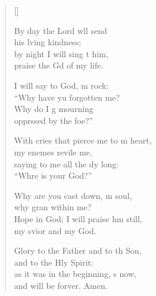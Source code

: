 \begin{verse}[\versewidth]
\begin{patverse}
By day the Lord w\pointup{\i}ll send\Med\\
his lving kindness;\\
by night I will sing t him,\Med\\
praise the Gd of my life.

I will say to God, m rock:\Med\\
“Why have yu forgotten me?\\
Why do I g mourning\Med\\
opprssed by the foe?”

With cries that pierce me to m heart,\Med\\
my enemes revile me,\\
saying to me all the dy long:\Med\\
“Whre is your God?”

Why are you cast down, m soul,\Med\\
why gran within me?\\
Hope in God; I will praise h\pointup{\i}m still,\Med\\
my svior and my God.

Glory to the Father and to th Son,\Med\\
and to the Hly Spirit:\\
as it was in the beginning, \pointup{\i}s now,\Med\\
and will be forver. Amen. 
  \end{patverse}
\end{verse}
